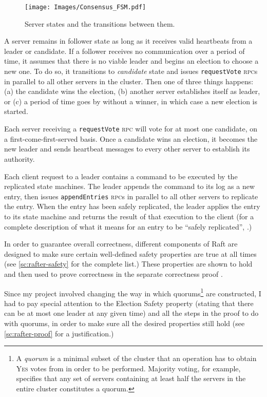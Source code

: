 \documentclass[12pt,chapterprefix=true,toc=bibliography,numbers=noendperiod,
               footnotes=multiple,twoside]{scrreprt}
\newcommand{\requestVoteRPC}[0]{\texttt{requestVote} \textsc{rpc}}
\newcommand{\appendEntriesRPC}[0]{\texttt{appendEntries} \textsc{rpc}}
\newcommand{\yes}{{\fontfamily{jkposn}\selectfont\textsc{Yes}}}
\begin{document}
\begin{figure}[h]
    \centering
    \texttt{[image: Images/Consensus\_FSM.pdf]}
    \caption{Server states and the transitions between them.
        \protect{}
    }
    \label{fig:consensus-fsm}
\end{figure}


A server remains in follower state as long as it receives valid heartbeats from a leader or candidate. If a follower receives no communication over a period of time, it assumes that there is no viable leader and begins an election to choose a new one. To do so, it transitions to \textit{candidate} state and issues \requestVoteRPC s in parallel to all other servers in the cluster. Then one of three things happens: (a) the candidate wins the election, (b) another server establishes itself as leader, or (c) a period of time goes by without a winner, in which case a new election is started.

Each server receiving a \requestVoteRPC{} will vote for at most one candidate, on a first-come-first-served basis. Once a candidate wins an election, it becomes the new leader and sends heartbeat messages to every other server to establish its authority.


Each client request to a leader contains a command to be executed by the replicated state machines. The leader appends the command to its log as a new entry, then issues \appendEntriesRPC s in parallel to all other servers to replicate the entry. When the entry has been safely replicated, the leader applies the entry to its state machine and returns the result of that execution to the client (for a complete description of what it means for an entry to be \enquote{safely replicated}, \cite[see][subsection 5.3]{raft}.)


In order to guarantee overall correctness, different components of Raft are designed to make sure certain well-defined safety properties are true at all times (see \cref{sc:rafter-safety} for the complete list.) These properties are shown to hold and then used to prove correctness in the separate correctness proof \autocite{raftproof}.

Since my project involved changing the way in which quorums\footnote{A \emph{quorum} is a minimal subset of the cluster that an operation has to obtain \yes{} votes from in order to be performed. Majority voting, for example, specifies that any set of servers containing at least half the servers in the entire cluster constitutes a quorum.} are constructed, I had to pay special attention to the Election Safety property (stating that there can be at most one leader at any given time) and all the steps in the proof to do with quorums, in order to make sure all the desired properties still hold (see \cref{sc:rafter-proof} for a justification.)
\end{document}
